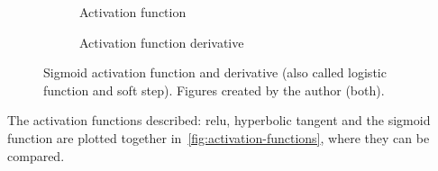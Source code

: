 \begin{figure}[ht]
  \centering
  \begin{subfigure}[b]{.375\textwidth}
    \centering
    \caption{Activation function}
  \end{subfigure}\hspace{3em}
  \begin{subfigure}[b]{.375\textwidth}
    \centering
    \caption{Activation function derivative}
  \end{subfigure}
  \caption[Sigmoid activation function]{Sigmoid activation function and
    derivative (also called logistic function and soft step). Figures created
    by the author (both).}%
  \label{fig:sigmoid}
\end{figure}

The activation functions described: \gls{relu}, hyperbolic tangent and the
sigmoid function are plotted together in\ \vref{fig:activation-functions},
where they can be compared.

